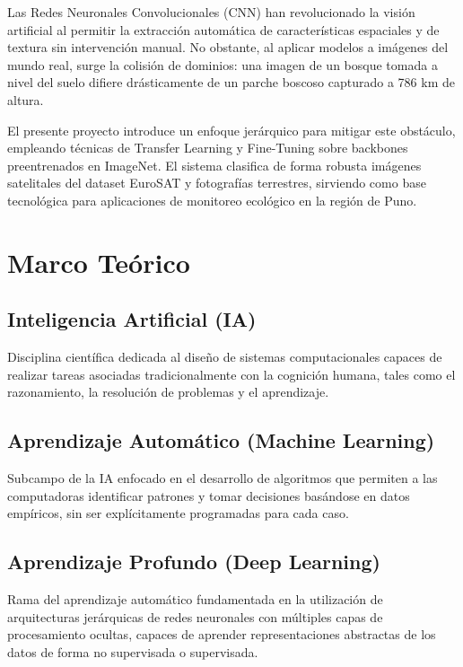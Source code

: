 \documentclass[conference,onecolumn]{IEEEtran}
\begin{document}
Las Redes Neuronales Convolucionales (CNN) han revolucionado la visión artificial al permitir la extracción automática de características espaciales y de textura sin intervención manual. No obstante, al aplicar modelos a imágenes del mundo real, surge la colisión de dominios: una imagen de un bosque tomada a nivel del suelo difiere drásticamente de un parche boscoso capturado a 786 km de altura. 

El presente proyecto introduce un enfoque jerárquico para mitigar este obstáculo, empleando técnicas de Transfer Learning y Fine-Tuning sobre backbones preentrenados en ImageNet. El sistema clasifica de forma robusta imágenes satelitales del dataset EuroSAT y fotografías terrestres, sirviendo como base tecnológica para aplicaciones de monitoreo ecológico en la región de Puno.

\section{Marco Teórico}

\subsection{Inteligencia Artificial (IA)}
Disciplina científica dedicada al diseño de sistemas computacionales capaces de realizar tareas asociadas tradicionalmente con la cognición humana, tales como el razonamiento, la resolución de problemas y el aprendizaje.

\subsection{Aprendizaje Automático (Machine Learning)}
Subcampo de la IA enfocado en el desarrollo de algoritmos que permiten a las computadoras identificar patrones y tomar decisiones basándose en datos empíricos, sin ser explícitamente programadas para cada caso.

\subsection{Aprendizaje Profundo (Deep Learning)}
Rama del aprendizaje automático fundamentada en la utilización de arquitecturas jerárquicas de redes neuronales con múltiples capas de procesamiento ocultas, capaces de aprender representaciones abstractas de los datos de forma no supervisada o supervisada.
\end{document}
